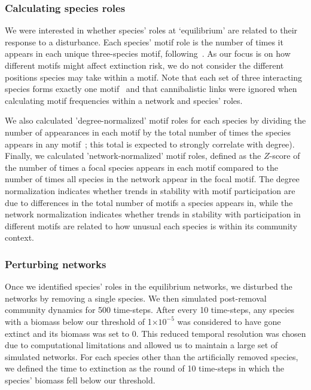 \documentclass[12pt]{article}
\begin{document}
\begin{spacing}{2.0}
    
    	\subsubsection*{Calculating species roles}
    
    
    		We were interested in whether species' roles at `equilibrium' are related to their response to a disturbance. 
            Each species' motif role is the number of times it appears in each unique three-species motif, following~\citet{Stouffer2012,Cirtwill2015}. 
            As our focus is on how different motifs might affect extinction risk, we do not consider the different positions species may take within a motif.   
            Note that each set of three interacting species forms exactly one motif~\citep{Cirtwill2018FoodWebs} and that cannibalistic links were ignored when calculating motif frequencies within a network and species' roles. 


            We also calculated 'degree-normalized' motif roles for each species by dividing the number of appearances in each motif by the total number of times the species appears in any motif~\citep{Cirtwill2015}; this total is expected to strongly correlate with degree). 
            Finally, we calculated 'network-normalized' motif roles, defined as the $Z$-score of the number of times a focal species appears in each motif compared to the number of times all species in the network appear in the focal motif.
    		The degree normalization indicates whether trends in stability with motif participation are due to differences in the total number of motifs a species appears in, while the network normalization indicates whether trends in stability with participation in different motifs are related to how unusual each species is within its community context.
    
    
    	\subsubsection*{Perturbing networks}
    
    		Once we identified species' roles in the equilibrium networks, we disturbed the networks by removing a single species. 
            We then simulated post-removal community dynamics for 500 time-steps.
            After every 10 time-steps, any species with a biomass below our threshold of 1$\times10^{-5}$ was considered to have gone extinct and its biomass was set to 0.
            This reduced temporal resolution was chosen due to computational limitations and allowed us to maintain a large set of simulated networks.
            For each species other than the artificially removed species, we defined the time to extinction as the round of 10 time-steps in which the species' biomass fell below our threshold. 



\end{spacing}
\end{document}
